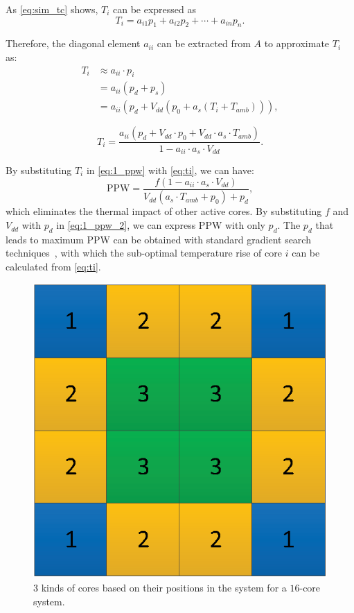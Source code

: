 As \eqref{eq:sim_tc} shows, $T_{i}$ can be expressed as
\begin{equation}\label{eq:ti}
T_{i} =a_{i1}p_{1} + a_{i2}p_{2} +\cdots + a_{in}p_{n}. 
\end{equation}


Therefore, the diagonal element $a_{ii}$ can be extracted from $A$ to approximate $T_{i}$ as:
\begin{equation}\label{eq:t_ap}
\begin{split}
T_{i}&\approx a_{ii} \cdot p_{i}\\
&=a_{ii}(p_{d}+p_{s})\\
&=a_{ii}(p_{d}+V_{dd}(p_{0}+a_{s}(T_{i}+T_{amb}))),
\end{split}
\end{equation}

\begin{equation}\label{eq:ti}
T_{i}=\frac{a_{ii}(p_{d}+V_{dd}\cdot p_{0}+V_{dd}\cdot a_{s}\cdot T_{amb})}{1-a_{ii} \cdot a_{s} \cdot V_{dd}}.
\end{equation}

By substituting $T_{i}$ in \eqref{eq:1_ppw} with \eqref{eq:ti}, we can have:
\begin{equation}\label{eq:1_ppw_2}
\text{PPW} = \frac{f(1-a_{ii} \cdot a_{s} \cdot V_{dd})}{V_{dd}(a_{s}\cdot T_{amb}+p_{0})+p_{d}},
\end{equation}
which eliminates the thermal impact of other active cores. By substituting $f$ and $V_{dd}$ with $p_{d}$ in \eqref{eq:1_ppw_2}, we can express PPW with only $p_{d}$. The $p_{d}$ that leads to maximum PPW can be obtained with standard gradient search techniques~\cite{Boyd:Convex_BOOK'06}, with which the sub-optimal temperature rise of core $i$ can be calculated from \eqref{eq:ti}.

\begin{figure}
\centering
\includegraphics[width=0.46\linewidth]{fig/unique_position.eps}
\caption{$3$ kinds of cores based on their positions in the system for a $16$-core system.}
\label{fig:unique_position}
\end{figure}

